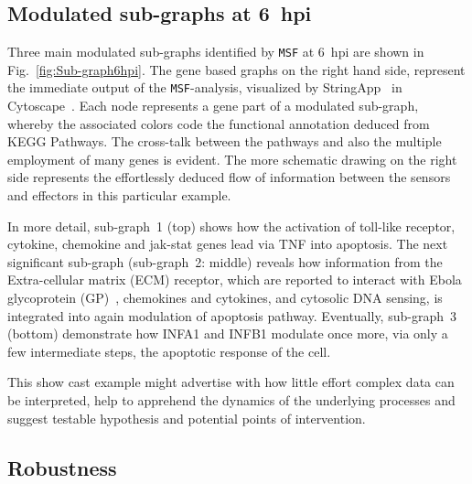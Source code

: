 \documentclass[10pt,a4paper,twocolumn]{article}
\begin{document}
\subsection*{Modulated sub-graphs at 6~hpi}

 Three main modulated sub-graphs identified by \texttt{MSF} at 6~hpi are
 shown in Fig.~\ref{fig:Sub-graph6hpi}. The gene based graphs on the right
 hand side, represent the immediate output of the \texttt{MSF}-analysis,
 visualized by StringApp~\cite{StringApp} in Cytoscape~\cite{Cyto}. Each
 node represents a gene part of a modulated sub-graph, whereby the
 associated colors code the functional annotation deduced from KEGG
 Pathways. The cross-talk between the pathways and also the multiple
 employment of many genes is evident. The more schematic drawing on the
 right side represents the effortlessly deduced flow of information between
 the sensors and effectors in this particular example.

 In more detail, sub-graph~1 (top) shows how the activation of toll-like
 receptor, cytokine, chemokine and jak-stat genes lead via TNF into
 apoptosis. The next significant sub-graph (sub-graph~2: middle) reveals
 how information from the Extra-cellular matrix (ECM) receptor, which are
 reported to interact with Ebola glycoprotein (GP)~\cite{Veljkovic},
 chemokines and cytokines, and cytosolic DNA sensing, is integrated into
 again modulation of apoptosis pathway. Eventually, sub-graph~3 (bottom)
 demonstrate how INFA1 and INFB1 modulate once more, via only a few
 intermediate steps, the apoptotic response of the cell.

 This show cast example might advertise with how little effort complex data
 can be interpreted, help to apprehend the dynamics of the underlying
 processes and suggest testable hypothesis and potential points of
 intervention.

 \subsection*{Robustness}
\end{document}
